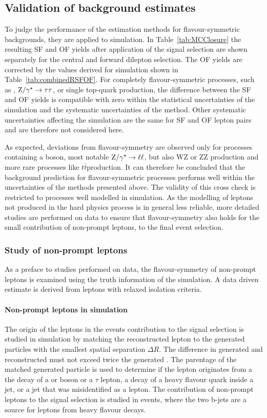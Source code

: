 \subsection{Validation of background estimates}
\label{sec:validation}
To judge the performance of the estimation methods for flavour-symmetric backgrounds, they are applied to simulation. In Table~\ref{tab:MCClosure} the resulting SF and OF yields after application of the signal selection are shown separately for the central and forward dilepton selection. The OF yields are corrected by the \Rsfof values derived for simulation shown in Table~\ref{tab:combinedRSFOF}. For completely flavour-symmetric processes, such as \ttbar, $\mathrm{Z}/\gamma^{\star}\rightarrow \tau\tau$, or single top-quark production, the difference between the SF and OF yields is compatible with zero within the statistical uncertainties of the simulation and the systematic uncertainties of the method. Other systematic uncertainties affecting the simulation are the same for SF and OF lepton pairs and are therefore not considered here. 

 As expected, deviations from flavour-symmetry are observed only for processes containing a \Z boson, most notable $\mathrm{Z}/\gamma^{\star}\rightarrow \ell\ell$, but also $\mathrm{WZ}$ or $\mathrm{ZZ}$ production and more rare processes like $t\bar{t}$\Z production. It can therefore be concluded that the background prediction for flavour-symmetric processes performs well within the uncertainties of the methods presented above. The validity of this cross check is restricted to processes well modelled in simulation. As the modelling of leptons not produced in the hard physics process is in general less reliable, more detailed studies are performed on data to ensure that flavour-symmetry also holds for the small contribution of non-prompt leptons, to the final event selection.
\subsubsection*{Study of non-prompt leptons}
As a preface to studies performed on data, the flavour-symmetry of non-prompt leptons is examined using the truth information of the simulation. A data driven estimate is derived from leptons with relaxed isolation criteria.
\paragraph*{Non-prompt leptons in simulation}
The origin of the leptons in the events contribution to the signal selection is studied in simulation by matching the reconstructed lepton to the generated particles with the smallest spatial separation $\Delta R$. The difference in generated and reconstructed \pt must not exceed twice the generated \pt. The parentage of the matched generated particle is used to determine if the lepton originates from a the decay of a \Z or \W boson or a $\tau$ lepton, a decay of a heavy flavour quark inside a jet, or a jet that was misidentified as a lepton. The contribution of non-prompt leptons to the signal selection is studied in \ttbar events, where the two b-jets are a source for leptons from heavy flavour decays. 

